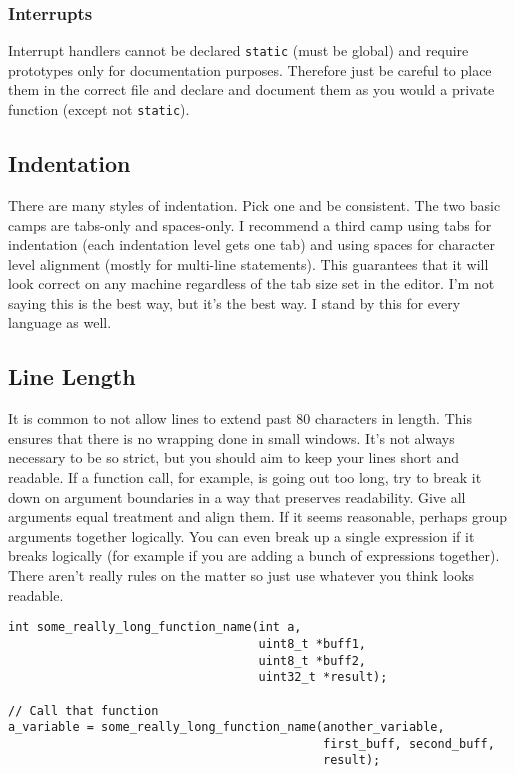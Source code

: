 \documentclass[10pt]{article}
\begin{document}
\subsubsection{Interrupts}

Interrupt handlers cannot be declared \texttt{static} (must be global) and require prototypes only for documentation purposes. Therefore just be careful to place them in the correct file and declare and document them as you would a private function (except not \texttt{static}).

\subsection{Indentation}

There are many styles of indentation. Pick one and be consistent. The two basic camps are tabs-only and spaces-only. I recommend a third camp using tabs for indentation (each indentation level gets one tab) and using spaces for character level alignment (mostly for multi-line statements). This guarantees that it will look correct on any machine regardless of the tab size set in the editor. I'm not saying this is the best way, but it's the best way. I stand by this for every language as well.

\subsection{Line Length}

It is common to not allow lines to extend past 80 characters in length. This ensures that there is no wrapping done in small windows. It's not always necessary to be so strict, but you should aim to keep your lines short and readable. If a function call, for example, is going out too long, try to break it down on argument boundaries in a way that preserves readability. Give all arguments equal treatment and align them. If it seems reasonable, perhaps group arguments together logically. You can even break up a single expression if it breaks logically (for example if you are adding a bunch of expressions together). There aren't really rules on the matter so just use whatever you think looks readable.

\begin{lstlisting}[label=lst-line-length,caption=Limiting line length]
int some_really_long_function_name(int a,
                                   uint8_t *buff1,
                                   uint8_t *buff2,
                                   uint32_t *result);

// Call that function
a_variable = some_really_long_function_name(another_variable,
                                            first_buff, second_buff,
                                            result);
\end{lstlisting}
\end{document}
